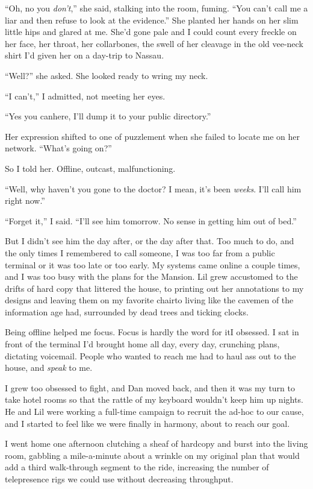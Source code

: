 “Oh, no you \emph{don't},” she said, stalking into the room,
fuming. “You can't call me a liar and then refuse to look at the
evidence.” She planted her hands on her slim little hips and glared
at me. She'd gone pale and I could count every freckle on her face,
her throat, her collarbones, the swell of her cleavage in the old
vee-neck shirt I'd given her on a day-trip to Nassau.

“Well?” she asked. She looked ready to wring my neck.

“I can't,” I admitted, not meeting her eyes.

“Yes you can{\dash}here, I'll dump it to your public directory.”

Her expression shifted to one of puzzlement when she failed to
locate me on her network. “What's going on?”

So I told her. Offline, outcast, malfunctioning.

“Well, why haven't you gone to the doctor? I mean, it's been
\emph{weeks}. I'll call him right now.”

“Forget it,” I said. “I'll see him tomorrow. No sense in getting
him out of bed.”

But I didn't see him the day after, or the day after that. Too much
to do, and the only times I remembered to call someone, I was too
far from a public terminal or it was too late or too early. My
systems came online a couple times, and I was too busy with the
plans for the Mansion. Lil grew accustomed to the drifts of hard
copy that littered the house, to printing out her annotations to my
designs and leaving them on my favorite chair{\dash}to living like the
cavemen of the information age had, surrounded by dead trees and
ticking clocks.

Being offline helped me focus. Focus is hardly the word for it{\dash}I
obsessed. I sat in front of the terminal I'd brought home all day,
every day, crunching plans, dictating voicemail. People who wanted
to reach me had to haul ass out to the house, and \emph{speak} to
me.

I grew too obsessed to fight, and Dan moved back, and then it was
my turn to take hotel rooms so that the rattle of my keyboard
wouldn't keep him up nights. He and Lil were working a full-time
campaign to recruit the ad-hoc to our cause, and I started to feel
like we were finally in harmony, about to reach our goal.

I went home one afternoon clutching a sheaf of hardcopy and burst
into the living room, gabbling a mile-a-minute about a wrinkle on
my original plan that would add a third walk-through segment to the
ride, increasing the number of telepresence rigs we could use
without decreasing throughput.

